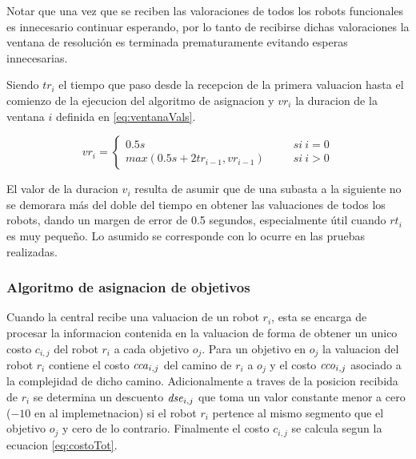 Notar que una vez que se reciben las valoraciones de todos los robots
funcionales es innecesario continuar esperando, por lo tanto de recibirse
dichas valoraciones la ventana de resolución es terminada prematuramente
evitando esperas innecesarias.

Siendo $tr_i$ el tiempo que paso desde la recepcion de la primera valuacion
hasta el comienzo de la ejecucion del algoritmo de asignacion y $vr_i$ la
duracion de la ventana $i$ definida en \ref{eq:ventanaVals}.

\begin{equation} 
  vr_i = 
  \left \{ 
    \begin{aligned}
      0.5s                            \ \ \ \ \ \ \ \ & si\ i = 0\\ 
      max(0.5s + 2tr_{i-1}, vr_{i-1}) \ \ \ \ \ \ \ \ & si\ i > 0
    \end{aligned}
  \right .
  \label{eq:ventanaVals}
\end{equation}

El valor de la duracion $v_i$ resulta de asumir que de una subasta a la
siguiente no se demorara más del doble del tiempo en obtener las valuaciones de
todos los robots, dando un margen de error de 0.5 segundos, especialmente útil
cuando $rt_i$ es muy pequeño. Lo asumido se corresponde con lo ocurre en las
pruebas realizadas.




\subsubsection{Algoritmo de asignacion de objetivos}
Cuando la central recibe una valuacion de un robot $r_i$, esta se encarga de
procesar la informacion contenida en la valuacion de forma de obtener un unico
costo $c_{i,j}$ del robot $r_i$ a cada objetivo $o_j$. Para un objetivo en
$o_j$ la valuacion del robot $r_i$ contiene el costo $\mathit{cca}_{i,j}$ del camino de
$r_i$ a $o_j$ y el costo $\mathit{cco}_{i,j}$ asociado a la complejidad de dicho camino.
Adicionalmente a traves de la posicion recibida de $r_i$ se determina un descuento 
$\mathit{dse}_{i,j}$ que toma un valor constante menor a cero ($-10$ en al
implemetnacion) si el robot $r_i$ pertence al mismo segmento que el objetivo
$o_j$ y cero de lo contrario. Finalmente el costo $c_{i,j}$ se calcula segun la
ecuacion \ref{eq:costoTot}.

